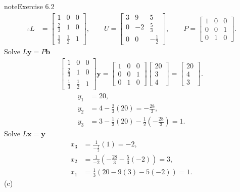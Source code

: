 \documentclass[letterpaper,10pt,english]{jupyterBook}
\begin{document}
\begin{sphinxadmonition}{note}{Exercise 6.2}
\begin{align*}
    \therefore L &= \left[\begin{matrix}1 & 0 & 0\\\frac{2}{3} & 1 & 0\\\frac{1}{3} & \frac{1}{2} & 1\end{matrix}\right], \qquad
    U = \left[\begin{matrix}3 & 9 & 5\\0 & -2 & \frac{5}{3}\\0 & 0 & - \frac{1}{2}\end{matrix}\right], \qquad
    P = \left[\begin{matrix}1 & 0 & 0\\0 & 0 & 1\\0 & 1 & 0\end{matrix}\right].
\end{align*}
\sphinxAtStartPar
Solve \(L \mathbf{y} = P \mathbf{b}\)
\begin{align*} \left[\begin{matrix}1 & 0 & 0\\\frac{2}{3} & 1 & 0\\\frac{1}{3} & \frac{1}{2} & 1\end{matrix}\right] \mathbf{y} = \left[\begin{matrix}1 & 0 & 0\\0 & 0 & 1\\0 & 1 & 0\end{matrix}\right] \left[\begin{matrix}20\\3\\4\end{matrix}\right] = \left[\begin{matrix}20\\4\\3\end{matrix}\right]. \end{align*}\begin{align*}
    y_{1} &= 20, \\
    y_{2} &= 4 - \frac{2}{3}\left(20\right) = - \frac{28}{3}, \\
    y_{3} &= 3 - \frac{1}{3}\left(20\right) - \frac{1}{2}\left(- \frac{28}{3}\right) = 1.
\end{align*}
\sphinxAtStartPar
Solve \(L \mathbf{x} = \mathbf{y}\)
\begin{align*}
    x_{3} &= \frac{1}{- \frac{1}{2}}\left(1\right) = -2, \\
    x_{2} &= \frac{1}{-2}\left(- \frac{28}{3} - \frac{5}{3}\left(-2\right)\right) = 3, \\
    x_{1} &= \frac{1}{3}\left(20 - 9\left(3\right) - 5\left(-2\right)\right) = 1.
\end{align*}
\sphinxAtStartPar
(c)

\end{sphinxadmonition}
\end{document}
